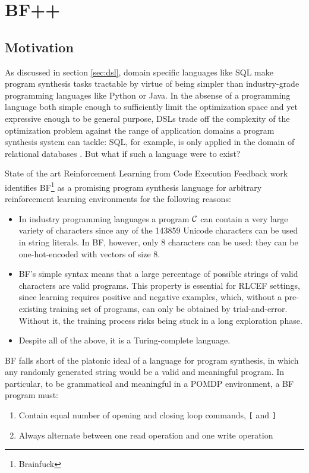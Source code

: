 \chapter{BF++}\label{ch:bfpp}


\section{Motivation}

As discussed in section \ref{sec:dsl}, domain specific languages like SQL make program synthesis tasks tractable by virtue of being simpler than industry-grade programming languages like Python or Java.
In the absense of a programming language both simple enough to sufficiently limit the optimization space and yet expressive enough to be general purpose, DSLs trade off the complexity of the optimization problem against the range of application domains a program synthesis system can tackle: SQL, for example, is only applied in the domain of relational databases \cite{atzeniRelationalDatabaseTheory1993}.
But what if such a language were to exist?

State of the art Reinforcement Learning from Code Execution Feedback work \cite{abolafiaNeuralProgramSynthesis2018} identifies BF\footnote{Brainfuck} \cite{brainfuck} as a promising program synthesis language for arbitrary reinforcement learning environments for the following reasons:
\begin{itemize}
    \item In industry programming languages a program $\mathcal{C}$ can contain a very large variety of characters since any of the 143859 Unicode \cite{allenUnicodeStandard2012} characters can be used in string literals. In BF, however, only 8 characters can be used: they can be one-hot-encoded with vectors of size 8. 
    \item BF's simple syntax means that a large percentage of possible strings of valid characters are valid programs. 
    This property is essential for RLCEF settings, since learning requires positive and negative examples, which, without a pre-existing training set of programs, can only be obtained by trial-and-error.
    Without it, the training process risks being stuck in a long exploration phase.
    \item Despite all of the above, it is a Turing-complete language.
\end{itemize}

BF falls short of the platonic ideal of a language for program synthesis, in which any randomly generated string would be a valid and meaningful program.
In particular, to be grammatical and meaningful in a POMDP environment, a BF program must:
\begin{enumerate}
    \item Contain equal number of opening and closing loop commands, \texttt{[} and \texttt{]}
    \item Always alternate between one read operation and one write operation
\end{enumerate}

